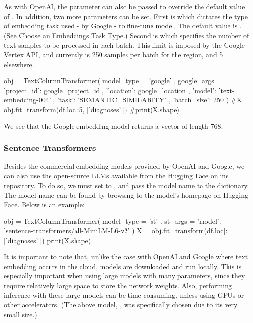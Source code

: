 \documentclass[article]{jss}
\begin{document}
As with OpenAI, the  parameter can also be passed to override the default value of . In addition, two more parameters can be set. First is  which dictates the type of embedding task used - by Google - to fine-tune model. The default value is . (See \href{https://cloud.google.com/vertex-ai/generative-ai/docs/embeddings/task-types}{Choose an Embeddings Task Type}.) Second is  which specifies the number of text samples to be processed in each batch. This limit is imposed by the Google Vertex API, and currently is 250 samples per batch for the  region, and 5 elsewhere.


\begin{pyblock}
obj = TextColumnTransformer(
    model_type = 'google'
    , google_args = {
        'project_id': google_project_id
        , 'location': google_location
        , 'model': 'text-embedding-004'
        , 'task': 'SEMANTIC_SIMILARITY'
        , 'batch_size': 250
    }
)
#X = obj.fit_transform(df.loc[:5, ['diagnoses']])
#print(X.shape)
\end{pyblock}

We see that the Google embedding model returns a vector of length 768.

\subsubsection{Sentence Transformers}\label{subsubsec:using-embed-st}

Besides the commercial embedding models provided by OpenAI and Google, we can also use the open-source LLMs available from the Hugging Face online repository. To do so, we must set  to , and pass the model name to the  dictionary. The model name can be found by browsing to the model's homepage on Hugging Face. Below is an example:
\begin{pyblock}
obj = TextColumnTransformer(
    model_type = 'st'
    , st_args = {
        'model': 'sentence-transformers/all-MiniLM-L6-v2'
    }
)
X = obj.fit_transform(df.loc[:, ['diagnoses']])
print(X.shape)
\end{pyblock}
\stdoutpythontex %

It is important to note that, unlike the case with OpenAI and Google where text embedding occurs in the cloud,  models are downloaded and run locally. This is especially important when using large models with many parameters, since they require relatively large space to store the network weights. Also, performing inference with these large models can be time consuming, unless using GPUs or other accelerators. (The above model, , was specifically chosen due to its very small size.)
\end{document}
